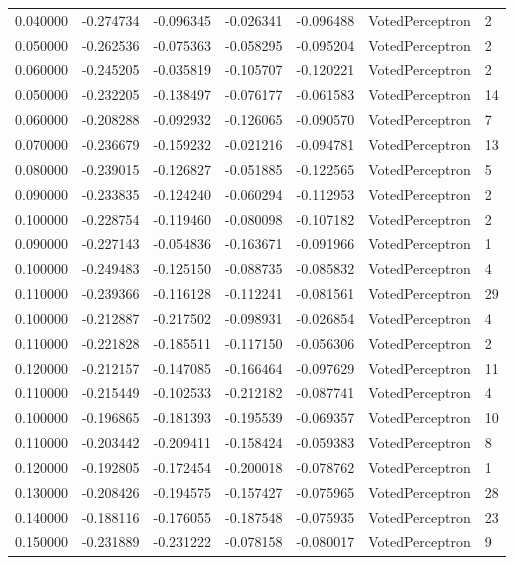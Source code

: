 \begin{tabular}{rrrrrll}
0.040000 & -0.274734 & -0.096345 & -0.026341 & -0.096488 & VotedPerceptron & 2 \\
0.050000 & -0.262536 & -0.075363 & -0.058295 & -0.095204 & VotedPerceptron & 2 \\
0.060000 & -0.245205 & -0.035819 & -0.105707 & -0.120221 & VotedPerceptron & 2 \\
0.050000 & -0.232205 & -0.138497 & -0.076177 & -0.061583 & VotedPerceptron & 14 \\
0.060000 & -0.208288 & -0.092932 & -0.126065 & -0.090570 & VotedPerceptron & 7 \\
0.070000 & -0.236679 & -0.159232 & -0.021216 & -0.094781 & VotedPerceptron & 13 \\
0.080000 & -0.239015 & -0.126827 & -0.051885 & -0.122565 & VotedPerceptron & 5 \\
0.090000 & -0.233835 & -0.124240 & -0.060294 & -0.112953 & VotedPerceptron & 2 \\
0.100000 & -0.228754 & -0.119460 & -0.080098 & -0.107182 & VotedPerceptron & 2 \\
0.090000 & -0.227143 & -0.054836 & -0.163671 & -0.091966 & VotedPerceptron & 1 \\
0.100000 & -0.249483 & -0.125150 & -0.088735 & -0.085832 & VotedPerceptron & 4 \\
0.110000 & -0.239366 & -0.116128 & -0.112241 & -0.081561 & VotedPerceptron & 29 \\
0.100000 & -0.212887 & -0.217502 & -0.098931 & -0.026854 & VotedPerceptron & 4 \\
0.110000 & -0.221828 & -0.185511 & -0.117150 & -0.056306 & VotedPerceptron & 2 \\
0.120000 & -0.212157 & -0.147085 & -0.166464 & -0.097629 & VotedPerceptron & 11 \\
0.110000 & -0.215449 & -0.102533 & -0.212182 & -0.087741 & VotedPerceptron & 4 \\
0.100000 & -0.196865 & -0.181393 & -0.195539 & -0.069357 & VotedPerceptron & 10 \\
0.110000 & -0.203442 & -0.209411 & -0.158424 & -0.059383 & VotedPerceptron & 8 \\
0.120000 & -0.192805 & -0.172454 & -0.200018 & -0.078762 & VotedPerceptron & 1 \\
0.130000 & -0.208426 & -0.194575 & -0.157427 & -0.075965 & VotedPerceptron & 28 \\
0.140000 & -0.188116 & -0.176055 & -0.187548 & -0.075935 & VotedPerceptron & 23 \\
0.150000 & -0.231889 & -0.231222 & -0.078158 & -0.080017 & VotedPerceptron & 9 \\

\end{tabular}

